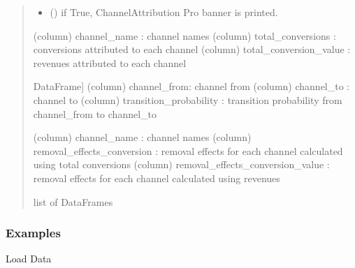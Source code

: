 \documentclass[letterpaper,10pt,english]{sphinxmanual}
\begin{document}
\begin{fulllineitems}
\begin{quote}
\begin{description}
\begin{itemize}
\item {} 
\sphinxAtStartPar
{} (\sphinxstyleliteralemphasis{\sphinxupquote{, }}) \textendash{} if True, ChannelAttribution Pro banner is printed.

\end{itemize}

\sphinxAtStartPar
\begin{description}
\sphinxAtStartPar
(column) channel\_name : channel names
(column) total\_conversions : conversions attributed to each channel
(column) total\_conversion\_value : revenues attributed to each channel

\sphinxlineitem{transition\_matrix}{[}DataFrame{]}
\sphinxAtStartPar
(column) channel\_from: channel from
(column) channel\_to : channel to
(column) transition\_probability : transition probability from channel\_from to channel\_to

\sphinxAtStartPar
(column) channel\_name : channel names
(column) removal\_effects\_conversion : removal effects for each channel calculated using total conversions
(column) removal\_effects\_conversion\_value : removal effects for each channel calculated using revenues

\end{description}


\sphinxAtStartPar
list of DataFrames

\end{description}\end{quote}
\subsubsection*{Examples}

\sphinxAtStartPar
Load Data

\begin{sphinxVerbatim}[commandchars=\\\{\}]
 
  
\end{sphinxVerbatim}


\end{fulllineitems}
\end{document}
